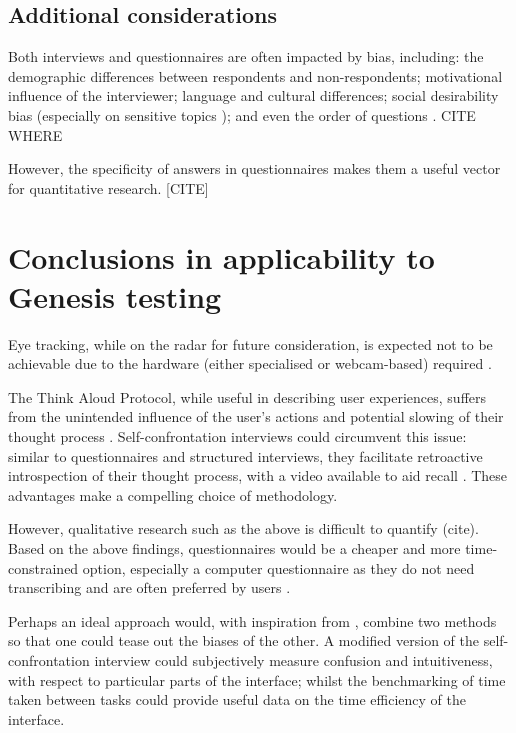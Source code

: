 \documentclass{scrartcl}
\begin{document}
\subsection{Additional considerations}
Both interviews and questionnaires are often impacted by bias, including: the demographic differences between respondents and non-respondents; motivational influence of the interviewer; language and cultural differences; social desirability bias (especially on sensitive topics \cite{sensitivequestions}); and even the order of questions \cite{questionnairebias}. CITE WHERE \cite{moresurveybias}

However, the specificity of answers in questionnaires makes them a useful vector for quantitative research. [CITE]

\section{Conclusions in applicability to Genesis testing}
Eye tracking, while on the radar for future consideration, is expected not to be achievable due to the hardware (either specialised or webcam-based) required \cite{poole_eye_2006} \cite{majaranta_chapter_2014} \cite{lowcosttracker}.

The Think Aloud Protocol, while useful in describing user experiences, suffers from the unintended influence of the user's actions and potential slowing of their thought process \cite{e._fonteyn_description_1993} \cite{metcalfe_intuition_1987}. Self-confrontation interviews could circumvent this issue: similar to questionnaires and structured interviews, they facilitate retroactive introspection of their thought process, with a video available to aid recall \cite{cranach_analysis_1982} \cite{lim_self-confrontation_2002}. These advantages make a compelling choice of methodology.

However, qualitative research such as the above is difficult to quantify (cite). Based on the above findings, questionnaires would be a cheaper and more time-constrained option, especially a computer questionnaire as they do not need transcribing and are often preferred by users \cite{computersurveys}.

Perhaps an ideal approach would, with inspiration from \cite{bach_combining_2011}, combine two methods so that one could tease out the biases of the other. A modified version of the self-confrontation interview could subjectively measure confusion and intuitiveness, with respect to particular parts of the interface; whilst the benchmarking of time taken between tasks could provide useful data on the time efficiency of the interface.

 

\end{document}
